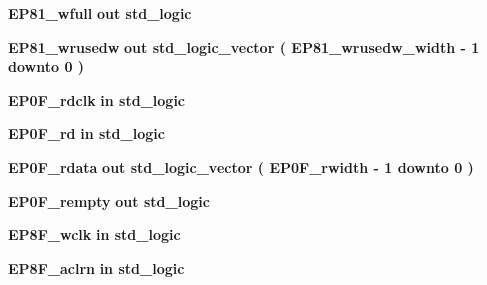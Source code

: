 \begin{DoxyCompactItemize}
\item 
{\bf E\+P81\+\_\+wfull}  {\bfseries {\bfseries \textcolor{keywordflow}{out}\textcolor{vhdlchar}{ }}} {\bfseries \textcolor{comment}{std\+\_\+logic}\textcolor{vhdlchar}{ }} 
\item 
{\bf E\+P81\+\_\+wrusedw}  {\bfseries {\bfseries \textcolor{keywordflow}{out}\textcolor{vhdlchar}{ }}} {\bfseries \textcolor{comment}{std\+\_\+logic\+\_\+vector}\textcolor{vhdlchar}{ }\textcolor{vhdlchar}{(}\textcolor{vhdlchar}{ }\textcolor{vhdlchar}{ }\textcolor{vhdlchar}{ }\textcolor{vhdlchar}{ }{\bfseries {\bf E\+P81\+\_\+wrusedw\+\_\+width}} \textcolor{vhdlchar}{-\/}\textcolor{vhdlchar}{ } \textcolor{vhdldigit}{1} \textcolor{vhdlchar}{ }\textcolor{keywordflow}{downto}\textcolor{vhdlchar}{ }\textcolor{vhdlchar}{ } \textcolor{vhdldigit}{0} \textcolor{vhdlchar}{ }\textcolor{vhdlchar}{)}\textcolor{vhdlchar}{ }} 
\item 
{\bf E\+P0\+F\+\_\+rdclk}  {\bfseries {\bfseries \textcolor{keywordflow}{in}\textcolor{vhdlchar}{ }}} {\bfseries \textcolor{comment}{std\+\_\+logic}\textcolor{vhdlchar}{ }} 
\item 
{\bf E\+P0\+F\+\_\+rd}  {\bfseries {\bfseries \textcolor{keywordflow}{in}\textcolor{vhdlchar}{ }}} {\bfseries \textcolor{comment}{std\+\_\+logic}\textcolor{vhdlchar}{ }} 
\item 
{\bf E\+P0\+F\+\_\+rdata}  {\bfseries {\bfseries \textcolor{keywordflow}{out}\textcolor{vhdlchar}{ }}} {\bfseries \textcolor{comment}{std\+\_\+logic\+\_\+vector}\textcolor{vhdlchar}{ }\textcolor{vhdlchar}{(}\textcolor{vhdlchar}{ }\textcolor{vhdlchar}{ }\textcolor{vhdlchar}{ }\textcolor{vhdlchar}{ }{\bfseries {\bf E\+P0\+F\+\_\+rwidth}} \textcolor{vhdlchar}{-\/}\textcolor{vhdlchar}{ } \textcolor{vhdldigit}{1} \textcolor{vhdlchar}{ }\textcolor{keywordflow}{downto}\textcolor{vhdlchar}{ }\textcolor{vhdlchar}{ } \textcolor{vhdldigit}{0} \textcolor{vhdlchar}{ }\textcolor{vhdlchar}{)}\textcolor{vhdlchar}{ }} 
\item 
{\bf E\+P0\+F\+\_\+rempty}  {\bfseries {\bfseries \textcolor{keywordflow}{out}\textcolor{vhdlchar}{ }}} {\bfseries \textcolor{comment}{std\+\_\+logic}\textcolor{vhdlchar}{ }} 
\item 
{\bf E\+P8\+F\+\_\+wclk}  {\bfseries {\bfseries \textcolor{keywordflow}{in}\textcolor{vhdlchar}{ }}} {\bfseries \textcolor{comment}{std\+\_\+logic}\textcolor{vhdlchar}{ }} 
\item 
{\bf E\+P8\+F\+\_\+aclrn}  {\bfseries {\bfseries \textcolor{keywordflow}{in}\textcolor{vhdlchar}{ }}} {\bfseries \textcolor{comment}{std\+\_\+logic}\textcolor{vhdlchar}{ }} 

\end{DoxyCompactItemize}
